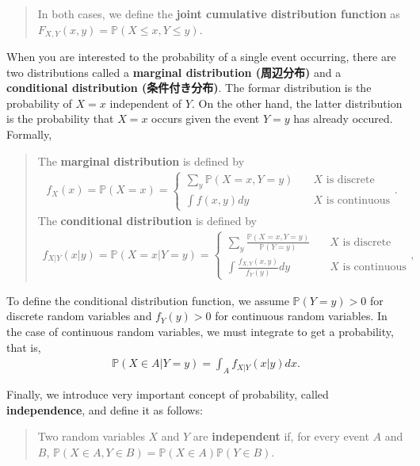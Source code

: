 \documentclass[
  12pt,
]{article}
\begin{document}
\begin{quote}
In both cases, we define the \textbf{joint cumulative distribution
function} as \(F_{X,Y}(x, y) = \mathbb{P}(X \le x, Y \le y)\).
\end{quote}

When you are interested to the probability of a single event occurring,
there are two distributions called a \textbf{marginal distribution
(周辺分布)} and a \textbf{conditional distribution (条件付き分布)}. The
formar distribution is the probability of \(X = x\) independent of
\(Y\). On the other hand, the latter distribution is the probability
that \(X = x\) occurs given the event \(Y = y\) has already occured.
Formally,

\begin{quote}
The \textbf{marginal distribution} is defined by \begin{align*}
f_X(x) 
= 
\mathbb{P}(X = x)
=
\begin{cases}
\sum_y \mathbb{P}(X = x, Y = y)  &\quad\text{$X$ is discrete} \\
\int f(x, y) dy &\quad\text{$X$ is continuous}
\end{cases}.
\end{align*} The \textbf{conditional distribution} is defined by
\begin{align*}
f_{X|Y}(x|y)
= 
\mathbb{P}(X = x | Y = y)
= 
\begin{cases}
\sum_y \frac{\mathbb{P}(X = x, Y = y)}{\mathbb{P}(Y = y)}  &\quad\text{$X$ is discrete} \\
\int \frac{f_{X,Y}(x, y)}{f_Y(y)} dy &\quad\text{$X$ is continuous}
\end{cases},
\end{align*}
\end{quote}

To define the conditional distribution function, we assume
\(\mathbb{P}(Y = y) > 0\) for discrete random variables and
\(f_Y(y) > 0\) for continuous random variables. In the case of
continuous random variables, we must integrate to get a probability,
that is, \begin{align*}
  \mathbb{P}(X \in A | Y = y) = \int_A f_{X|Y}(x|y) dx.
\end{align*}

Finally, we introduce very important concept of probability, called
\textbf{independence}, and define it as follows:

\begin{quote}
Two random variables \(X\) and \(Y\) are \textbf{independent} if, for
every event \(A\) and \(B\),
\(\mathbb{P}(X \in A, Y \in B) = \mathbb{P}(X \in A) \mathbb{P}(Y \in B)\).
\end{quote}
\end{document}
